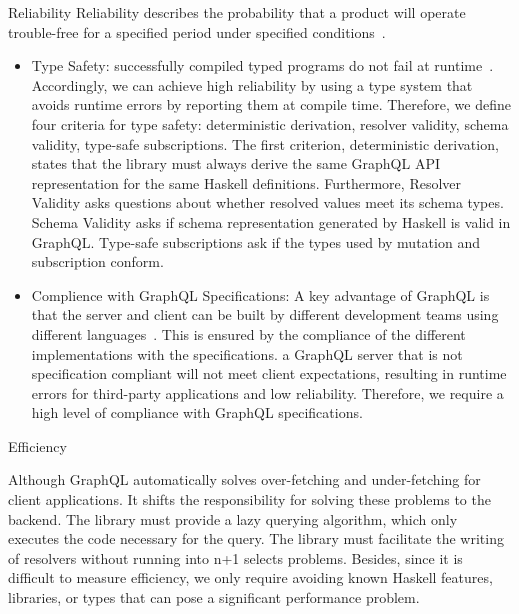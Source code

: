\begin{frame}
\begin{alertblock}{Reliability}
Reliability describes the probability that a product will operate trouble-free for a specified period under specified conditions~\cite{optimal-release-time}.

\begin{itemize}
    \item Type Safety: successfully compiled typed programs do not fail at runtime~\cite{milner-well-typed,wadler-well-typed}.  Accordingly, we can achieve high reliability by using a type system that avoids runtime errors by reporting them at compile time. Therefore, we define four criteria for type safety: deterministic derivation, resolver validity, schema validity, type-safe subscriptions.  
    The first criterion, deterministic derivation, states that the library must always derive the same GraphQL API representation for the same Haskell definitions. 
    Furthermore, Resolver Validity asks questions 
    about whether resolved values meet its schema types. 
    Schema Validity asks if schema representation generated by Haskell is valid in GraphQL. Type-safe subscriptions ask if the types used by mutation and subscription conform.
    \item Complience with GraphQL Specifications:
    A key advantage of GraphQL is that the server and client can be built by different development teams using different languages~\cite{gql-healthcare}. 
    This is ensured by the compliance of the different implementations with the specifications. a GraphQL server that is not specification compliant will not meet client expectations, resulting in runtime errors for third-party applications and low reliability. Therefore, we require a high level of compliance with GraphQL specifications.
\end{itemize}

\end{alertblock}


\begin{alertblock}{Efficiency} 
  
Although GraphQL automatically solves over-fetching and under-fetching for client applications. 
It shifts the responsibility for solving these problems to the backend.  
The library must provide a lazy querying algorithm, which only executes the code necessary for the query. 
The library must facilitate the writing of resolvers 
without running into n+1 selects 
problems. Besides, since it is difficult to measure efficiency, we only require avoiding known Haskell features, libraries, or types that can pose a significant performance problem.

\end{alertblock}

\end{frame}